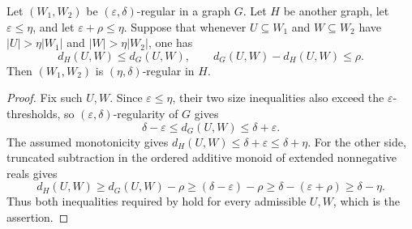 \begin{lemma}
Let $(W_1,W_2)$ be $(\varepsilon,\delta)$-regular in a graph $G$.  Let $H$ be another graph, let $\varepsilon\leq\eta$, and let $\varepsilon+\rho\leq\eta$.  Suppose that whenever $U\subseteq W_1$ and $W\subseteq W_2$ have $|U|>\eta|W_1|$ and $|W|>\eta|W_2|$, one has
\[
 d_H(U,W)\leq d_G(U,W),\qquad d_G(U,W)-d_H(U,W)\leq\rho.
\]
Then $(W_1,W_2)$ is $(\eta,\delta)$-regular in $H$.
\end{lemma}
\begin{proof}
Fix such $U,W$.  Since $\varepsilon\leq\eta$, their two size inequalities also exceed the $\varepsilon$-thresholds, so $(\varepsilon,\delta)$-regularity of $G$ gives
\[
 \delta-\varepsilon\leq d_G(U,W)\leq\delta+\varepsilon.
\]
The assumed monotonicity gives $d_H(U,W)\leq\delta+\varepsilon\leq\delta+\eta$.  For the other side, truncated subtraction in the ordered additive monoid of extended nonnegative reals gives
\[
 d_H(U,W)\geq d_G(U,W)-\rho\geq(\delta-\varepsilon)-\rho
 \geq\delta-(\varepsilon+\rho)\geq\delta-\eta.
\]
Thus both inequalities required by  hold for every admissible $U,W$, which is the assertion.
\end{proof}

